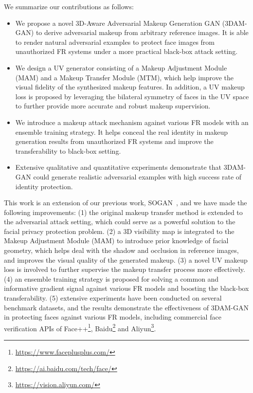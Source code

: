 \documentclass[10pt,journal,compsoc]{IEEEtran}
\begin{document}
We summarize our contributions as follows:
\begin{itemize}
\item We propose a novel 3D-Aware Adversarial Makeup Generation GAN (3DAM-GAN) to derive adversarial makeup from arbitrary reference images. It is able to render natural adversarial examples to protect face images from unauthorized FR systems under a more practical black-box attack setting.

\item We design a UV generator consisting of a Makeup Adjustment Module (MAM) and a Makeup Transfer Module (MTM), which help improve the visual fidelity of the synthesized makeup features. In addition, a UV makeup loss is proposed by leveraging the bilateral symmetry of faces in the UV space to further provide more accurate and robust makeup supervision. 

\item We introduce a makeup attack mechanism against various FR models with an ensemble training strategy. It helps conceal the real identity in makeup generation results from unauthorized FR systems and improve the transferability to black-box setting.

\item Extensive qualitative and quantitative experiments demonstrate that 3DAM-GAN could generate realistic adversarial examples with high success rate of identity protection.
\end{itemize}

This work is an extension of our previous work, SOGAN~\cite{lyu2021sogan}, and we have made the following improvements:
(1) the original makeup transfer method is extended to the adversarial attack setting, which could serve as a powerful solution to the facial privacy protection problem.
(2) a 3D visibility map is integrated to the Makeup Adjustment Module (MAM) to introduce prior knowledge of facial geometry, which helps deal with the shadow and occlusion in reference images, and improves the visual quality of the generated makeup. 
(3) a novel UV makeup loss is involved to further supervise the makeup transfer process more effectively. 
(4) an ensemble training strategy is proposed for solving a common and informative gradient signal against various FR models and boosting the black-box transferability. 
(5) extensive experiments have been conducted on several benchmark datasets, and the results demonstrate the effectiveness of 3DAM-GAN in protecting faces against various FR models, including commercial face verification APIs of Face++\footnote[2]{\url{https://www.faceplusplus.com/}}, Baidu\footnote[3]{\url{https://ai.baidu.com/tech/face/}} and Aliyun\footnote[4]{\url{https://vision.aliyun.com/}}. 
\end{document}
